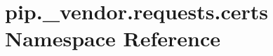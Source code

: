 \hypertarget{namespacepip_1_1__vendor_1_1requests_1_1certs}{}\section{pip.\+\_\+vendor.\+requests.\+certs Namespace Reference}
\label{namespacepip_1_1__vendor_1_1requests_1_1certs}
